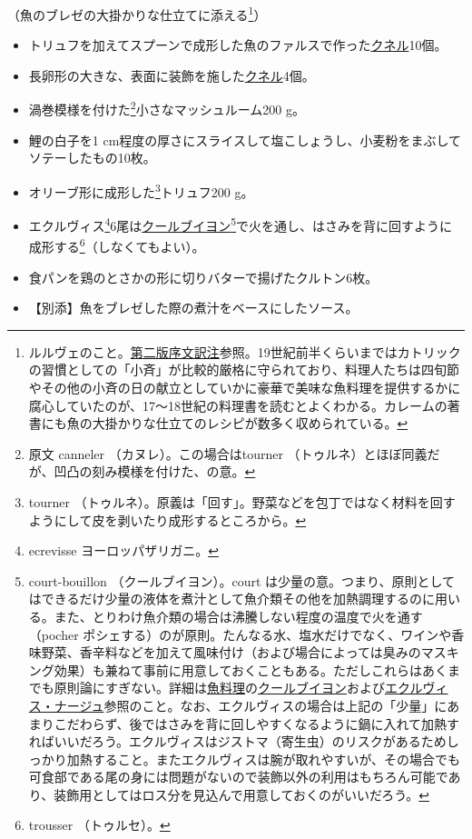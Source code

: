 \begin{recette}
（魚のブレゼの大掛かりな仕立てに添える\footnote{ルルヴェのこと。\protect\hyperlink{releve}{第二版序文訳注}参照。19世紀前半くらいまではカトリックの習慣としての「小斉」が比較的厳格に守られており、料理人たちは四旬節やその他の小斉の日の献立としていかに豪華で美味な魚料理を提供するかに腐心していたのが、17〜18世紀の料理書を読むとよくわかる。カレームの著書にも魚の大掛かりな仕立てのレシピが数多く収められている。}）

\begin{itemize}
\item
  トリュフを加えてスプーンで成形した魚のファルスで作った\protect\hyperlink{quenelles}{クネル}10個。
\item
  長卵形の大きな、表面に装飾を施した\protect\hyperlink{quenelles}{クネル}4個。
\item
  渦巻模様を付けた\footnote{原文 canneler （カヌレ）。この場合はtourner
    （トゥルネ）とほぼ同義だが、凹凸の刻み模様を付けた、の意。}小さなマッシュルーム200
  g。
\item
  鯉の白子を1
  cm程度の厚さにスライスして塩こしょうし、小麦粉をまぶしてソテーしたもの10枚。
\item
  オリーブ形に成形した\footnote{tourner
    （トゥルネ）。原義は「回す」。野菜などを包丁ではなく材料を回すようにして皮を剥いたり成形するところから。}トリュフ200
  g。
\item
  エクルヴィス\footnote{ecrevisse ヨーロッパザリガニ。}6尾は\protect\hyperlink{courtbouillon-a}{クールブイヨン}\footnote{court-bouillon
    （クールブイヨン）。court
    は少量の意。つまり、原則としてはできるだけ少量の液体を煮汁として魚介類その他を加熱調理するのに用いる。また、とりわけ魚介類の場合は沸騰しない程度の温度で火を通す（pocher
    ポシェする）のが原則。たんなる水、塩水だけでなく、ワインや香味野菜、香辛料などを加えて風味付け（および場合によっては臭みのマスキング効果）も兼ねて事前に用意しておくこともある。ただしこれらはあくまでも原則論にすぎない。詳細は\protect\hyperlink{poissons}{魚料理}の\protect\hyperlink{serie-de-courts-bouillons-de-poisson}{クールブイヨン}および\protect\hyperlink{ecrevisse-a-la-nage}{エクルヴィス・ナージュ}参照のこと。なお、エクルヴィスの場合は上記の「少量」にあまりこだわらず、後ではさみを背に回しやすくなるように鍋に入れて加熱すればいいだろう。エクルヴィスはジストマ（寄生虫）のリスクがあるためしっかり加熱すること。またエクルヴィスは腕が取れやすいが、その場合でも可食部である尾の身には問題がないので装飾以外の利用はもちろん可能であり、装飾用としてはロス分を見込んで用意しておくのがいいだろう。}で火を通し、はさみを背に回すように成形する\footnote{trousser
    （トゥルセ）。}（しなくてもよい）。
\item
  食パンを鶏のとさかの形に切りバターで揚げたクルトン6枚。
\item
  【別添】魚をブレゼした際の煮汁をベースにしたソース。
\end{itemize}


\end{recette}
